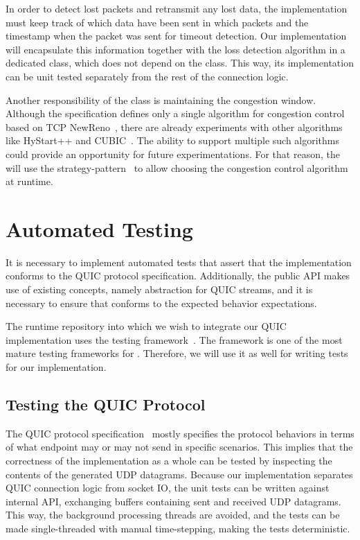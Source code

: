In order to detect lost packets and retransmit any lost data, the \QuicConnection{} implementation
must keep track of which data have been sent in which packets and the timestamp when the packet was
sent for timeout detection. Our implementation will encapsulate this information together with the
loss detection algorithm in a dedicated \RecoveryController{} class, which does not depend on the
\QuicConnection{} class. This way, its implementation can be unit tested separately from the rest of
the connection logic.

Another responsibility of the \RecoveryController{} class is maintaining the congestion window.
Although the specification defines only a single algorithm for congestion control based on TCP
NewReno~\cite[Section~7]{draft-ietf-quic-recovery}, there are already experiments with other
algorithms like HyStart++ and CUBIC~\cite{cloudflareCubic}. The ability to support multiple such
algorithms could provide an opportunity for future experimentations. For that reason, the
\RecoveryController{} will use the \gls{strategy-pattern}~\cite{wiki:strategy-pattern} to allow
choosing the congestion control algorithm at runtime.

\section{Automated Testing}

It is necessary to implement automated tests that assert that the implementation conforms to the
QUIC protocol specification. Additionally, the public API makes use of existing concepts, namely
 abstraction for QUIC streams, and it is necessary to ensure that \QuicStream{}
conforms to the expected  behavior expectations.

The \dotnet{} runtime repository into which we wish to integrate our QUIC implementation uses the
\xUnit{} testing framework~\cite{xunit}. The \xUnit{} framework is one of the most mature testing
frameworks for \dotnet{}. Therefore, we will use it as well for writing tests for our
implementation.

\subsection{Testing the QUIC Protocol}

The QUIC protocol specification~\cite{draft-ietf-quic-transport} mostly specifies the protocol
behaviors in terms of what endpoint may or may not send in specific scenarios. This implies that the
correctness of the implementation as a whole can be tested by inspecting the contents of the
generated UDP datagrams. Because our implementation separates QUIC connection logic from socket IO,
the unit tests can be written against internal \QuicConnection{} API, exchanging buffers containing
sent and received UDP datagrams. This way, the background processing threads are avoided, and the
tests can be made single-threaded with manual time-stepping, making the tests deterministic.

